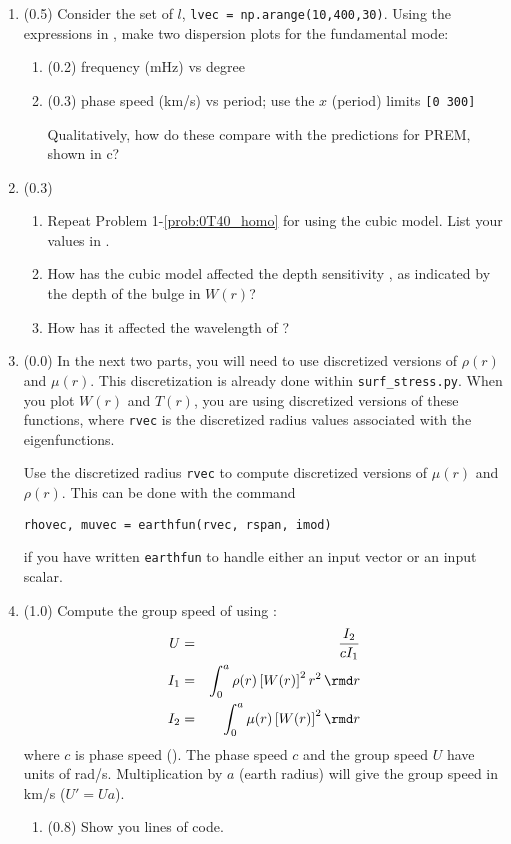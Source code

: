 \documentclass[11pt,titlepage,fleqn]{article}
\newcommand{\tfileB}{{\tt surf\_stress.py}}
\begin{document}
\begin{enumerate}
\item (0.5) Consider the set of $l$, \verb+lvec = np.arange(10,400,30)+. Using the expressions in , make two dispersion plots for the fundamental mode:
%
\begin{enumerate}
\item (0.2) frequency (mHz) vs degree

\item (0.3) phase speed (km/s) vs period; use the $x$ (period) limits \verb+[0 300]+

Qualitatively, how do these compare with the predictions for PREM, shown in c?
\end{enumerate}

\item (0.3)
%
\begin{enumerate}
\item Repeat Problem 1-\ref{prob:0T40_homo} for  using the cubic model. List your values in .
\item How has the cubic model affected the depth sensitivity , as indicated by the depth of the bulge in $W(r)$?
\item How has it affected the wavelength of ?
\end{enumerate}

\label{prob:0T40_cubic}


\item (0.0) In the next two parts, you will need to use discretized versions of $\rho(r)$ and $\mu(r)$. This discretization is already done within \tfileB. When you plot $W(r)$ and $T(r)$, you are using discretized versions of these functions, where \verb+rvec+ is the discretized radius values associated with the eigenfunctions.

Use the discretized radius \verb+rvec+ to compute discretized versions of $\mu(r)$ and $\rho(r)$. This can be done with the command
%
\begin{verbatim}
rhovec, muvec = earthfun(rvec, rspan, imod)
\end{verbatim}
%
if you have written \verb+earthfun+ to handle either an input vector or an input scalar.


\item (1.0) Compute the group speed of  using \citep[][Eq. 11.67]{DT}:
%
\begin{eqnarray}
U &=& \frac{I_2}{cI_1}
\label{group}
\\
I_1 &=& \int_0^a \rho(r) \left[W(r)\right]^2 r^2 \, \rmd r
\\
I_2 &=& \int_0^a \mu(r) \left[W(r)\right]^2 \rmd r
\end{eqnarray}
%
where $c$ is phase speed (). %
The phase speed $c$ and the group speed $U$ have units of rad/s. Multiplication by $a$ (earth radius) will give the group speed in km/s ($U' = Ua$).
%
\begin{enumerate}
\item (0.8) Show you lines of code.


\end{enumerate}
\end{enumerate}
\end{document}
